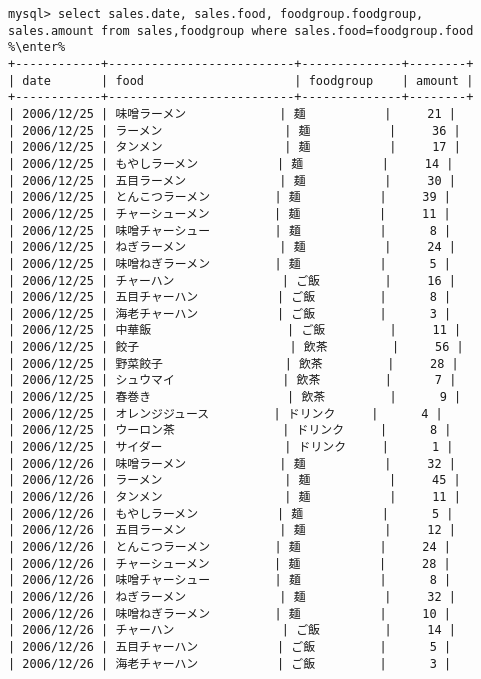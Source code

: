 \documentclass{jlreq}
\begin{document}
\begin{enumerate}
          \begin{lstlisting}
mysql> select sales.date, sales.food, foodgroup.foodgroup, sales.amount from sales,foodgroup where sales.food=foodgroup.food %\enter%
+------------+--------------------------+--------------+--------+
| date       | food                     | foodgroup    | amount |
+------------+--------------------------+--------------+--------+
| 2006/12/25 | 味噌ラーメン             | 麺           |     21 |
| 2006/12/25 | ラーメン                 | 麺           |     36 |
| 2006/12/25 | タンメン                 | 麺           |     17 |
| 2006/12/25 | もやしラーメン           | 麺           |     14 |
| 2006/12/25 | 五目ラーメン             | 麺           |     30 |
| 2006/12/25 | とんこつラーメン         | 麺           |     39 |
| 2006/12/25 | チャーシューメン         | 麺           |     11 |
| 2006/12/25 | 味噌チャーシュー         | 麺           |      8 |
| 2006/12/25 | ねぎラーメン             | 麺           |     24 |
| 2006/12/25 | 味噌ねぎラーメン         | 麺           |      5 |
| 2006/12/25 | チャーハン               | ご飯         |     16 |
| 2006/12/25 | 五目チャーハン           | ご飯         |      8 |
| 2006/12/25 | 海老チャーハン           | ご飯         |      3 |
| 2006/12/25 | 中華飯                   | ご飯         |     11 |
| 2006/12/25 | 餃子                     | 飲茶         |     56 |
| 2006/12/25 | 野菜餃子                 | 飲茶         |     28 |
| 2006/12/25 | シュウマイ               | 飲茶         |      7 |
| 2006/12/25 | 春巻き                   | 飲茶         |      9 |
| 2006/12/25 | オレンジジュース         | ドリンク     |      4 |
| 2006/12/25 | ウーロン茶               | ドリンク     |      8 |
| 2006/12/25 | サイダー                 | ドリンク     |      1 |
| 2006/12/26 | 味噌ラーメン             | 麺           |     32 |
| 2006/12/26 | ラーメン                 | 麺           |     45 |
| 2006/12/26 | タンメン                 | 麺           |     11 |
| 2006/12/26 | もやしラーメン           | 麺           |      5 |
| 2006/12/26 | 五目ラーメン             | 麺           |     12 |
| 2006/12/26 | とんこつラーメン         | 麺           |     24 |
| 2006/12/26 | チャーシューメン         | 麺           |     28 |
| 2006/12/26 | 味噌チャーシュー         | 麺           |      8 |
| 2006/12/26 | ねぎラーメン             | 麺           |     32 |
| 2006/12/26 | 味噌ねぎラーメン         | 麺           |     10 |
| 2006/12/26 | チャーハン               | ご飯         |     14 |
| 2006/12/26 | 五目チャーハン           | ご飯         |      5 |
| 2006/12/26 | 海老チャーハン           | ご飯         |      3 |

\end{lstlisting}
\end{enumerate}
\end{document}
